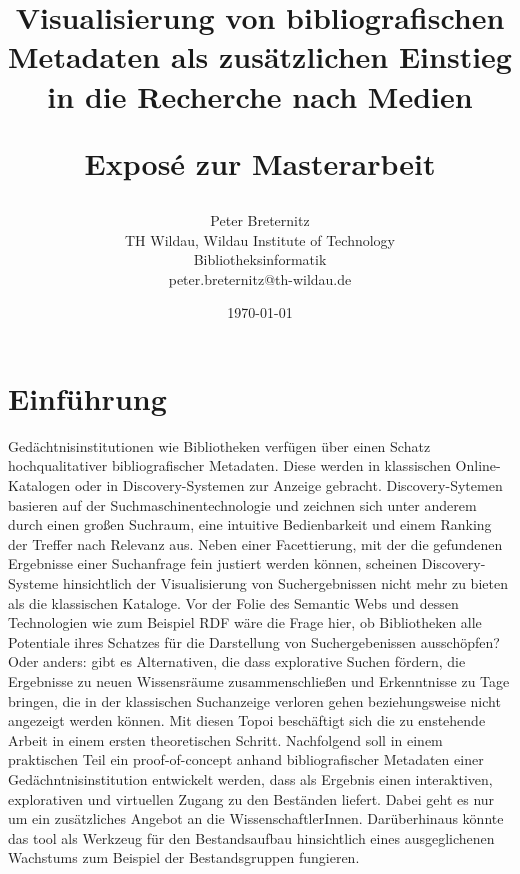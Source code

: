 \documentclass[10pt,a4paper,twocolumn,conference]{IEEEtran}
\begin{document}
\nocite{*}
\title{{\bf Visualisierung von bibliografischen Metadaten als zusätzlichen Einstieg in die
        Recherche nach Medien } \\ 
    \begin{large}
        Exposé zur Masterarbeit                                                                             
    \end{large}}
\author{
	Peter Breternitz \\
	TH Wildau, Wildau Institute of Technology\\ Bibliotheksinformatik \\
	peter.breternitz@th-wildau.de
}


\date{\today}

\maketitle

\section{Einführung}
Gedächtnisinstitutionen wie Bibliotheken verfügen über einen Schatz 
hochqualitativer bibliografischer Metadaten. Diese werden in klassischen 
Online-Katalogen oder in Discovery-Systemen zur Anzeige gebracht. 
Discovery-Sytemen basieren auf der Suchmaschinentechnologie und zeichnen sich 
unter anderem durch einen großen Suchraum, eine intuitive Bedienbarkeit und
einem Ranking der Treffer nach Relevanz aus. Neben einer Facettierung, 
mit der die gefundenen Ergebnisse einer Suchanfrage fein justiert werden 
können, scheinen Discovery-Systeme hinsichtlich der Visualisierung von Suchergebnissen 
nicht mehr zu bieten als die klassischen Kataloge. Vor der Folie
des Semantic Webs und dessen Technologien wie zum Beispiel RDF wäre die Frage
hier, ob Bibliotheken alle Potentiale ihres Schatzes für die Darstellung von
Suchergebenissen ausschöpfen? Oder anders: gibt es Alternativen, die dass 
explorative Suchen fördern, die Ergebnisse zu neuen Wissensräume zusammenschließen 
und Erkenntnisse zu Tage bringen, die in der klassischen Suchanzeige verloren
gehen beziehungsweise nicht angezeigt werden können. Mit diesen Topoi
beschäftigt sich die zu enstehende Arbeit in einem ersten theoretischen Schritt.
Nachfolgend soll in einem praktischen Teil ein proof-of-concept anhand 
bibliografischer Metadaten einer Gedächntnisinstitution entwickelt werden, dass
als Ergebnis einen interaktiven, explorativen und virtuellen Zugang zu den
Beständen liefert. Dabei geht es nur um ein zusätzliches Angebot an
die WissenschaftlerInnen. Darüberhinaus könnte das tool als Werkzeug für den
Bestandsaufbau hinsichtlich  eines ausgeglichenen Wachstums zum
Beispiel der Bestandsgruppen fungieren. 
\end{document}
